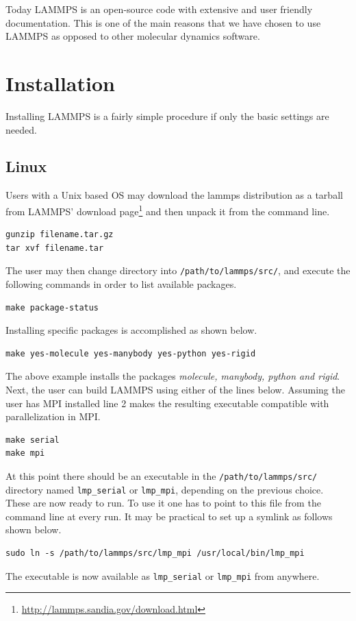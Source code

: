 \documentclass[twoside,english]{uiofysmaster}
\begin{document}
Today LAMMPS is an open-source code with extensive and user friendly documentation. This is one of the main reasons that we have chosen to use LAMMPS as opposed to other molecular dynamics software. 

\section{Installation}
Installing LAMMPS is a fairly simple procedure if only the basic settings are needed.

\subsection{Linux}
Users with a Unix based OS may download the lammps distribution as a tarball from LAMMPS' download page\footnote{\href{http://lammps.sandia.gov/download.html}{http://lammps.sandia.gov/download.html}} and then unpack it from the command line.
\begin{lstlisting}
gunzip filename.tar.gz
tar xvf filename.tar
\end{lstlisting}
The user may then change directory into \texttt{/path/to/lammps/src/}, and execute the following commands in order to list available packages. 
\begin{lstlisting}
make package-status
\end{lstlisting}
Installing specific packages is accomplished as shown below.
\begin{lstlisting}
make yes-molecule yes-manybody yes-python yes-rigid 
\end{lstlisting}
The above example installs the packages \textit{molecule, manybody, python and rigid}.
Next, the user can build LAMMPS using either of the lines below. Assuming the user has MPI installed line 2 makes the resulting executable compatible with parallelization in MPI.
\begin{lstlisting}
make serial
make mpi
\end{lstlisting}
At this point there should be an executable in the \texttt{/path/to/lammps/src/} directory named \texttt{lmp\_serial} or \texttt{lmp\_mpi}, depending on the previous choice. These are now ready to run.
To use it one has to point to this file from the command line at every run. It may be practical to set up a symlink as follows shown below.

\begin{lstlisting}
sudo ln -s /path/to/lammps/src/lmp_mpi /usr/local/bin/lmp_mpi
\end{lstlisting}
The executable is now available as \texttt{lmp\_serial} or \texttt{lmp\_mpi} from anywhere.
\end{document}
